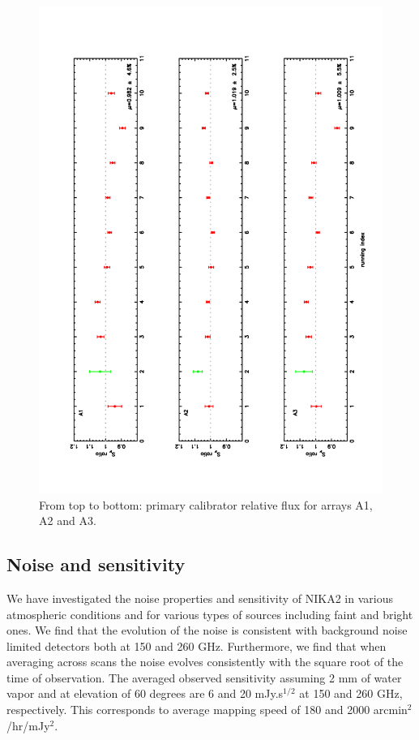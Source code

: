 \documentclass[]{aa} %
\begin{document}
\begin{figure}[h]
   \centering
    \includegraphics[angle=270,width=0.9\linewidth]{ratio_Ura_Nept.pdf}
     
      \caption{From top to bottom: primary calibrator relative flux for arrays A1, A2 and A3.}
         \label{fig:calibaccuracy}
\end{figure}

\subsection{Noise and sensitivity}
We have investigated the noise properties and sensitivity of NIKA2 in various atmospheric conditions and for various types of sources including faint and bright ones.
We find that the evolution of the noise is consistent with background noise limited detectors both at 150 and 260 GHz. Furthermore, we find that when averaging
across scans the noise evolves consistently with the square root of the time of observation.
The averaged observed sensitivity assuming 2 mm of water vapor 
and at elevation of 60 degrees are 6 and 20 mJy.s$^{1/2}$ at 150 and 260 GHz, respectively. This corresponds to average mapping speed of 180 and 2000 arcmin$^2$/hr/mJy$^2$.
\end{document}
